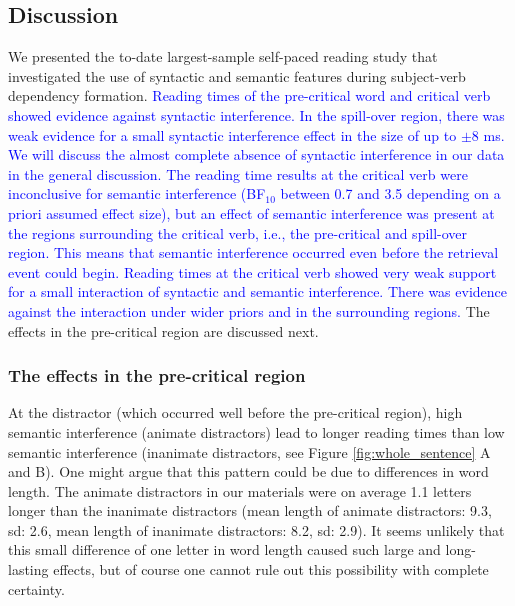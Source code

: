 \documentclass[a4paper, man, floatsintext]{apa7}
\begin{document}
\subsection{Discussion}
We presented the to-date largest-sample self-paced reading study that investigated the use of syntactic and semantic features during subject-verb dependency formation. \textcolor{blue}{Reading times of the pre-critical word and critical verb showed evidence against syntactic interference. In the spill-over region, there was weak evidence for a small syntactic interference effect in the size of up to $\pm$8 ms. We will discuss the almost complete absence of syntactic interference in our data in the general discussion. The reading time results at the critical verb were inconclusive for semantic interference (BF$_{10}$ between 0.7 and 3.5 depending on a priori assumed effect size), but an effect of semantic interference was present at the regions surrounding the critical verb, i.e., the pre-critical and spill-over region. This means that semantic interference occurred even before the retrieval event could begin. Reading times at the critical verb showed very weak support for a small interaction of syntactic and semantic interference. There was evidence against the interaction under wider priors and in the surrounding regions.} \label{only_precritical} The effects in the pre-critical region are discussed next.

\subsubsection{The effects in the pre-critical region}

At the distractor (which occurred well before the pre-critical region), high semantic interference (animate distractors) lead to longer reading times than low semantic interference (inanimate distractors, see Figure \ref{fig:whole_sentence} A and B). One might argue that this pattern could be due to differences in word length. The animate distractors in our materials were on average 1.1 letters longer than the inanimate distractors (mean length of animate distractors: 9.3, sd: 2.6, mean length of inanimate distractors: 8.2, sd: 2.9). It seems unlikely that this small difference of one letter in word length caused such large and long-lasting effects, but of course one cannot rule out this possibility with complete certainty.
\end{document}
